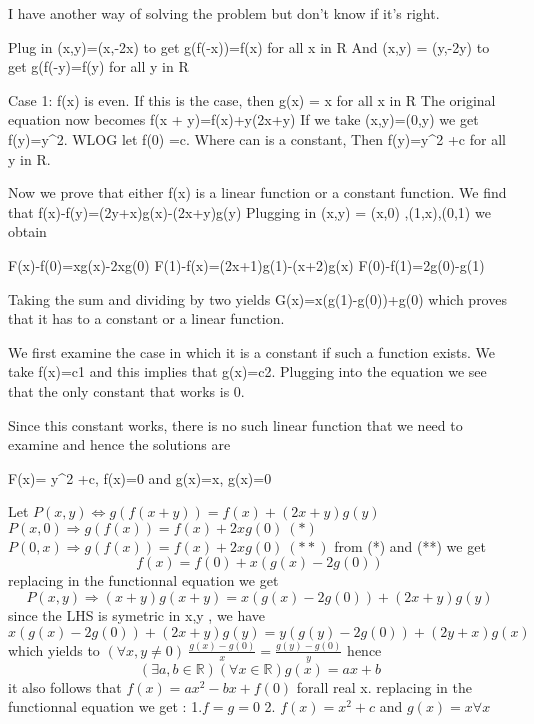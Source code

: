 \begin{solution}
	I have another way of solving the problem but don't know if it's right.

Plug in (x,y)=(x,-2x) to get g(f(-x))=f(x)     for all x in R
And (x,y) = (y,-2y) to get g(f(-y)=f(y)        for all y in R

Case 1: f(x) is even.
If this is the case, then g(x) = x for all x in R
The original equation now becomes f(x + y)=f(x)+y(2x+y)
If we take (x,y)=(0,y) we get f(y)=y^2. WLOG let f(0) =c. Where can is a constant,
Then f(y)=y^2 +c for all y in R.

Now we prove that either f(x) is a linear function or a constant function.
We find that f(x)-f(y)=(2y+x)g(x)-(2x+y)g(y)
Plugging in (x,y) = (x,0) ,(1,x),(0,1) we obtain

F(x)-f(0)=xg(x)-2xg(0)
F(1)-f(x)=(2x+1)g(1)-(x+2)g(x)
F(0)-f(1)=2g(0)-g(1)

Taking the sum and dividing by two yields
G(x)=x(g(1)-g(0))+g(0) which proves that it has to a constant or a linear function.

We first examine the case in which it is a constant if such a function exists.
We take f(x)=c1 and this implies that g(x)=c2. Plugging into the equation we see that the only constant that works is 0. 

Since this constant works, there is no such linear function that we need to examine and hence the solutions are 

F(x)= y^2 +c, f(x)=0 and g(x)=x, g(x)=0
\end{solution}



\begin{solution}
	Let $P(x,y)\Leftrightarrow g(f(x+y))=f(x)+(2x+y)g(y)$
$P(x,0)\Rightarrow  g(f(x))=f(x)+2xg(0)\  (*)$
$P(0,x) \Rightarrow  g(f(x))=f(x)+2xg(0) \ (**)$
from (*) and (**) we get \[f(x)=f(0)+x(g(x)-2g(0))\]
replacing in the functionnal equation we get \[P(x,y) \Rightarrow  (x+y)g(x+y)=x(g(x)-2g(0))+(2x+y)g(y)\]
since the LHS is symetric in x,y ,  we have  \[x(g(x)-2g(0))+(2x+y)g(y)=y(g(y)-2g(0))+(2y+x)g(x)\]
which yields to $(\forall x,y\neq 0) \ \frac{g(x)-g(0)}{x}=\frac{g(y)-g(0)}{y}$ hence \[(\exists a,b\in \mathbb{R}) (\forall x\in \mathbb{R}) g(x)=ax+b\]
it also follows that $f(x)=ax^2-bx+f(0)$ forall real x.
replacing in the functionnal equation we get : 
1.$f=g=0 $
2. $f(x)=x^2+c$ and $g(x)=x \forall x$
\end{solution}



